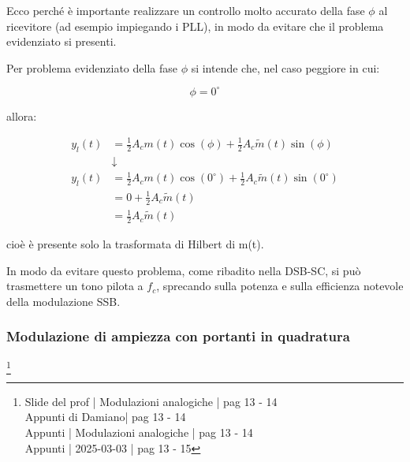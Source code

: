 Ecco perché è importante realizzare un controllo molto accurato della fase $\phi$ al ricevitore (ad esempio impiegando i PLL), 
in modo da evitare che il problema evidenziato si presenti. \newline 

Per problema evidenziato della fase $\phi$ si intende che, nel caso peggiore in cui: 

{
    \Large 
    \begin{equation}
        \phi = 0^{\circ}
    \end{equation}
}

allora: 

{
    \Large 
    \begin{equation}
        \begin{split}
        y_l (t)
        &=
        \frac{1}{2} A_c m(t) \cos(\phi)
        + 
        \frac{1}{2} A_c \tilde{m}(t) \sin(\phi)
        \\
        &\downarrow
        \\
        y_l (t)
        &=
        \frac{1}{2} A_c m(t) \cos(0^{\circ})
        + 
        \frac{1}{2} A_c \tilde{m}(t) \sin(0^{\circ})
        \\
        &= 
        0
        +
        \frac{1}{2} A_c \tilde{m}(t)
        \\
        &= 
        \frac{1}{2} A_c \tilde{m}(t)
        \end{split}
    \end{equation}
}

cioè è presente solo la trasformata di Hilbert di m(t). \newline 

In modo da evitare questo problema, come ribadito nella DSB-SC, si può trasmettere un tono pilota a $f_c$, 
sprecando sulla potenza e sulla efficienza notevole della modulazione SSB. \newline 

\newpage 

\subsubsection{Modulazione di ampiezza con portanti in quadratura}
\footnote{Slide del prof | Modulazioni analogiche | pag 13 - 14\\  
Appunti di Damiano| pag 13 - 14\\
Appunti | Modulazioni analogiche | pag 13 - 14\\
Appunti | 2025-03-03 | pag 13 - 15
} 

